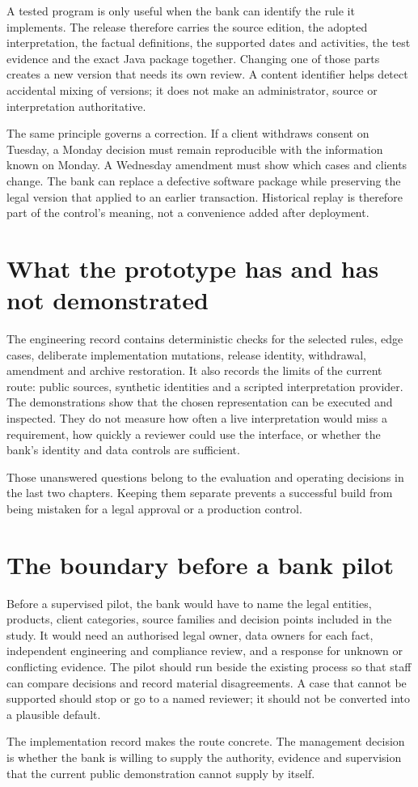 A tested program is only useful when the bank can identify the rule it implements.
The release therefore carries the source edition, the adopted interpretation,
the factual definitions, the supported dates and activities, the test evidence
and the exact Java package together. Changing one of those parts creates a new
version that needs its own review. A content identifier helps detect accidental
mixing of versions; it does not make an administrator, source or interpretation
authoritative.

The same principle governs a correction. If a client withdraws consent on
Tuesday, a Monday decision must remain reproducible with the information known
on Monday. A Wednesday amendment must show which cases and clients change. The
bank can replace a defective software package while preserving the legal version
that applied to an earlier transaction. Historical replay is therefore part of
the control's meaning, not a convenience added after deployment.

\section{What the prototype has and has not demonstrated}

The engineering record contains deterministic checks for the selected rules,
edge cases, deliberate implementation mutations, release identity, withdrawal,
amendment and archive restoration. It also records the limits of the current
route: public sources, synthetic identities and a scripted interpretation
provider. The demonstrations show that the chosen representation can be
executed and inspected. They do not measure how often a live interpretation
would miss a requirement, how quickly a reviewer could use the interface, or
whether the bank's identity and data controls are sufficient.

Those unanswered questions belong to the evaluation and operating decisions in
the last two chapters. Keeping them separate prevents a successful build from
being mistaken for a legal approval or a production control.

\section{The boundary before a bank pilot}

Before a supervised pilot, the bank would have to name the legal entities,
products, client categories, source families and decision points included in the
study. It would need an authorised legal owner, data owners for each fact,
independent engineering and compliance review, and a response for unknown or
conflicting evidence. The pilot should run beside the existing process so that
staff can compare decisions and record material disagreements. A case that cannot
be supported should stop or go to a named reviewer; it should not be converted
into a plausible default.

The implementation record makes the route concrete. The management decision is
whether the bank is willing to supply the authority, evidence and supervision
that the current public demonstration cannot supply by itself.
